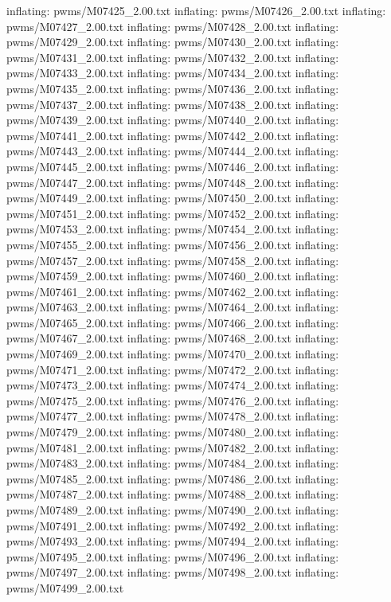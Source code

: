 \documentclass[letterpaper,10pt,english]{sphinxmanual}
\begin{document}
{\begin{sphinxVerbatim}[commandchars=\\\{\}]
  inflating: pwms/M07425\_2.00.txt
  inflating: pwms/M07426\_2.00.txt
  inflating: pwms/M07427\_2.00.txt
  inflating: pwms/M07428\_2.00.txt
  inflating: pwms/M07429\_2.00.txt
  inflating: pwms/M07430\_2.00.txt
  inflating: pwms/M07431\_2.00.txt
  inflating: pwms/M07432\_2.00.txt
  inflating: pwms/M07433\_2.00.txt
  inflating: pwms/M07434\_2.00.txt
  inflating: pwms/M07435\_2.00.txt
  inflating: pwms/M07436\_2.00.txt
  inflating: pwms/M07437\_2.00.txt
  inflating: pwms/M07438\_2.00.txt
  inflating: pwms/M07439\_2.00.txt
  inflating: pwms/M07440\_2.00.txt
  inflating: pwms/M07441\_2.00.txt
  inflating: pwms/M07442\_2.00.txt
  inflating: pwms/M07443\_2.00.txt
  inflating: pwms/M07444\_2.00.txt
  inflating: pwms/M07445\_2.00.txt
  inflating: pwms/M07446\_2.00.txt
  inflating: pwms/M07447\_2.00.txt
  inflating: pwms/M07448\_2.00.txt
  inflating: pwms/M07449\_2.00.txt
  inflating: pwms/M07450\_2.00.txt
  inflating: pwms/M07451\_2.00.txt
  inflating: pwms/M07452\_2.00.txt
  inflating: pwms/M07453\_2.00.txt
  inflating: pwms/M07454\_2.00.txt
  inflating: pwms/M07455\_2.00.txt
  inflating: pwms/M07456\_2.00.txt
  inflating: pwms/M07457\_2.00.txt
  inflating: pwms/M07458\_2.00.txt
  inflating: pwms/M07459\_2.00.txt
  inflating: pwms/M07460\_2.00.txt
  inflating: pwms/M07461\_2.00.txt
  inflating: pwms/M07462\_2.00.txt
  inflating: pwms/M07463\_2.00.txt
  inflating: pwms/M07464\_2.00.txt
  inflating: pwms/M07465\_2.00.txt
  inflating: pwms/M07466\_2.00.txt
  inflating: pwms/M07467\_2.00.txt
  inflating: pwms/M07468\_2.00.txt
  inflating: pwms/M07469\_2.00.txt
  inflating: pwms/M07470\_2.00.txt
  inflating: pwms/M07471\_2.00.txt
  inflating: pwms/M07472\_2.00.txt
  inflating: pwms/M07473\_2.00.txt
  inflating: pwms/M07474\_2.00.txt
  inflating: pwms/M07475\_2.00.txt
  inflating: pwms/M07476\_2.00.txt
  inflating: pwms/M07477\_2.00.txt
  inflating: pwms/M07478\_2.00.txt
  inflating: pwms/M07479\_2.00.txt
  inflating: pwms/M07480\_2.00.txt
  inflating: pwms/M07481\_2.00.txt
  inflating: pwms/M07482\_2.00.txt
  inflating: pwms/M07483\_2.00.txt
  inflating: pwms/M07484\_2.00.txt
  inflating: pwms/M07485\_2.00.txt
  inflating: pwms/M07486\_2.00.txt
  inflating: pwms/M07487\_2.00.txt
  inflating: pwms/M07488\_2.00.txt
  inflating: pwms/M07489\_2.00.txt
  inflating: pwms/M07490\_2.00.txt
  inflating: pwms/M07491\_2.00.txt
  inflating: pwms/M07492\_2.00.txt
  inflating: pwms/M07493\_2.00.txt
  inflating: pwms/M07494\_2.00.txt
  inflating: pwms/M07495\_2.00.txt
  inflating: pwms/M07496\_2.00.txt
  inflating: pwms/M07497\_2.00.txt
  inflating: pwms/M07498\_2.00.txt
  inflating: pwms/M07499\_2.00.txt

\end{sphinxVerbatim}}
\end{document}
